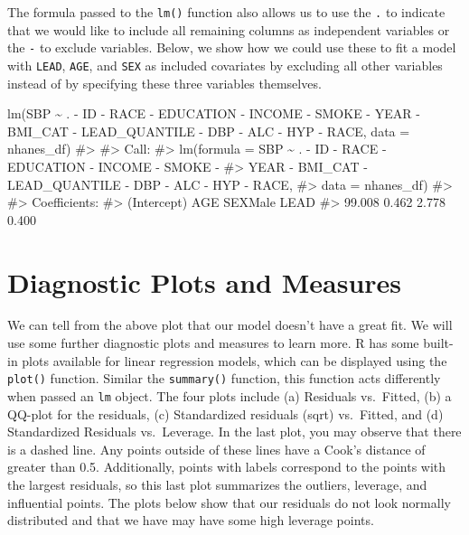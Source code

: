 \documentclass[
  letterpaper,
]{krantz}
\makeatletter
\newenvironment{Shaded}{\begin{snugshade}}{\end{snugshade}}
\newcommand{\AttributeTok}[1]{\textcolor[rgb]{0.40,0.45,0.13}{#1}}
\newcommand{\CommentTok}[1]{\textcolor[rgb]{0.37,0.37,0.37}{#1}}
\newcommand{\FunctionTok}[1]{\textcolor[rgb]{0.28,0.35,0.67}{#1}}
\newcommand{\NormalTok}[1]{\textcolor[rgb]{0.00,0.23,0.31}{#1}}
\newcommand{\SpecialCharTok}[1]{\textcolor[rgb]{0.37,0.37,0.37}{#1}}
\newenvironment{kframe}{%
\medskip{}
\setlength{\fboxsep}{.8em}
 \def\at@end@of@kframe{}%
 \ifinner\ifhmode%
  \def\at@end@of@kframe{\end{minipage}}%
  \begin{minipage}{\columnwidth}%
 \fi\fi%
 \def\FrameCommand##1{\hskip\@totalleftmargin \hskip-\fboxsep
 \colorbox{shadecolor}{##1}\hskip-\fboxsep
     \hskip-\linewidth \hskip-\@totalleftmargin \hskip\columnwidth}%
 \MakeFramed {\advance\hsize-\width
   \@totalleftmargin\z@ \linewidth\hsize
   \@setminipage}}%
 {\par\unskip\endMakeFramed%
 \at@end@of@kframe}
\renewenvironment{Shaded}{\begin{kframe}}{\end{kframe}}
\makeatother
\begin{document}
The formula passed to the \texttt{lm()} function also allows us to use
the \texttt{.} to indicate that we would like to include all remaining
columns as independent variables or the \texttt{-} to exclude variables.
Below, we show how we could use these to fit a model with \texttt{LEAD},
\texttt{AGE}, and \texttt{SEX} as included covariates by excluding all
other variables instead of by specifying these three variables
themselves.

\begin{Shaded}
\begin{Highlighting}[]
\FunctionTok{lm}\NormalTok{(SBP }\SpecialCharTok{\textasciitilde{}}\NormalTok{ . }\SpecialCharTok{{-}}\NormalTok{ ID }\SpecialCharTok{{-}}\NormalTok{ RACE }\SpecialCharTok{{-}}\NormalTok{ EDUCATION }\SpecialCharTok{{-}}\NormalTok{ INCOME }\SpecialCharTok{{-}}\NormalTok{ SMOKE }\SpecialCharTok{{-}}\NormalTok{ YEAR }\SpecialCharTok{{-}}\NormalTok{ BMI\_CAT }\SpecialCharTok{{-}} 
\NormalTok{   LEAD\_QUANTILE }\SpecialCharTok{{-}}\NormalTok{ DBP }\SpecialCharTok{{-}}\NormalTok{ ALC }\SpecialCharTok{{-}}\NormalTok{ HYP }\SpecialCharTok{{-}}\NormalTok{ RACE, }\AttributeTok{data =}\NormalTok{ nhanes\_df)}
\CommentTok{\#\textgreater{} }
\CommentTok{\#\textgreater{} Call:}
\CommentTok{\#\textgreater{} lm(formula = SBP \textasciitilde{} . {-} ID {-} RACE {-} EDUCATION {-} INCOME {-} SMOKE {-} }
\CommentTok{\#\textgreater{}     YEAR {-} BMI\_CAT {-} LEAD\_QUANTILE {-} DBP {-} ALC {-} HYP {-} RACE, }
\CommentTok{\#\textgreater{}     data = nhanes\_df)}
\CommentTok{\#\textgreater{} }
\CommentTok{\#\textgreater{} Coefficients:}
\CommentTok{\#\textgreater{} (Intercept)          AGE      SEXMale         LEAD  }
\CommentTok{\#\textgreater{}      99.008        0.462        2.778        0.400}
\end{Highlighting}
\end{Shaded}

\section{Diagnostic Plots and
Measures}\label{diagnostic-plots-and-measures}

We can tell from the above plot that our model doesn't have a great fit.
We will use some further diagnostic plots and measures to learn more. R
has some built-in plots available for linear regression models, which
can be displayed using the \texttt{plot()} function. Similar the
\texttt{summary()} function, this function acts differently when passed
an \texttt{lm} object. The four plots include (a) Residuals vs.~Fitted,
(b) a QQ-plot for the residuals, (c) Standardized residuals (sqrt)
vs.~Fitted, and (d) Standardized Residuals vs.~Leverage. In the last
plot, you may observe that there is a dashed line. Any points outside of
these lines have a Cook's distance of greater than 0.5. Additionally,
points with labels correspond to the points with the largest residuals,
so this last plot summarizes the outliers, leverage, and influential
points. The plots below show that our residuals do not look normally
distributed and that we have may have some high leverage points.
\end{document}

